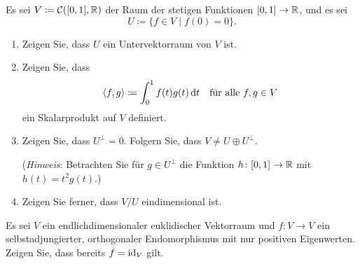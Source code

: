 \documentclass[a4paper,10pt]{scrartcl}
\begin{document}
\begin{question}
  Es sei $V \coloneqq \mathcal{C}([0,1], \mathbb{R})$ der Raum der stetigen Funktionen $[0,1] \to \mathbb{R}$, und es sei
  \[
    U \coloneqq \{ f \in V \mid f(0) = 0 \}.
  \]
  \begin{enumerate}[leftmargin=*]
    \item
      Zeigen Sie, dass $U$ ein Untervektorraum von $V$ ist.
    \item
      Zeigen Sie, dass
      \[
        \langle f, g \rangle \coloneqq \int_0^1 f(t) g(t) \,\text{d}t
        \quad
        \text{für alle $f, g \in V$}
      \]
      ein Skalarprodukt auf $V$ definiert.
    \item
      Zeigen Sie, dass $U^\perp = 0$.
      Folgern Sie, dass $V \neq U \oplus U^\perp$.
      
      (\emph{Hinweis}:
       Betrachten Sie für $g \in U^\perp$ die Funktion $h \colon [0,1] \to \mathbb{R}$ mit $h(t) = t^2 g(t)$.)
    \item
      Zeigen Sie ferner, dass $V\!/U$ eindimensional ist.
  \end{enumerate}
\end{question}


\begin{question}
  Es sei $V$ ein endlichdimensionaler euklidischer Vektorraum und $f \colon V \to V$ ein selbstadjungierter, orthogonaler Endomorphismus mit nur positiven Eigenwerten.
  Zeigen Sie, dass bereits $f = \operatorname{id}_V$ gilt.
\end{question}
\end{document}
